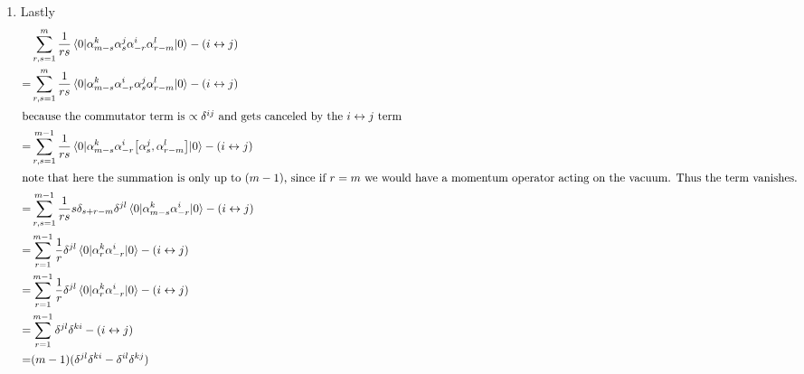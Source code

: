 \begin{enumerate}[label=(\alph*)]
\begin{enumerate}[label=(\roman*)]
			\item Lastly
				\begin{align*}
					&\sum^m_{r,s=1} \frac{1}{rs} \braket{0| \alpha^k_{m-s} \alpha^j_s \alpha^i_{-r} \alpha^l_{r-m} |0} - (i\leftrightarrow j) \\
					=&\sum^m_{r,s=1} \frac{1}{rs} \braket{0| \alpha^k_{m-s}  \alpha^i_{-r} \alpha^j_s\alpha^l_{r-m} |0} - (i\leftrightarrow j) \\
					\shortintertext{because the commutator term is $\propto \delta^{ij}$ and gets canceled by the $i\leftrightarrow j$ term}
					=&\sum^{m-1}_{r,s=1} \frac{1}{rs} \braket{0| \alpha^k_{m-s}  \alpha^i_{-r} \comm{\alpha^j_s}{\alpha^l_{r-m}} |0} - (i\leftrightarrow j) \\
					\shortintertext{note that here the summation is only up to $(m-1)$, since if $r=m$ we would have a momentum operator acting on the vacuum. Thus the term vanishes.}
					=&\sum^{m-1}_{r,s=1} \frac{1}{rs} s \delta_{s+r-m} \delta^{jl}\braket{0| \alpha^k_{m-s}  \alpha^i_{-r}  |0} - (i\leftrightarrow j) \\
					=&\sum^{m-1}_{r=1} \frac{1}{r}   \delta^{jl}\braket{0| \alpha^k_{r}  \alpha^i_{-r}  |0} - (i\leftrightarrow j) \\
					=&\sum^{m-1}_{r=1} \frac{1}{r}   \delta^{jl}\braket{0| \alpha^k_{r}  \alpha^i_{-r}  |0} - (i\leftrightarrow j) \\
					=&\sum^{m-1}_{r=1} \delta^{jl}\delta^{ki} - (i\leftrightarrow j) \\
					=& (m-1)(\delta^{jl} \delta^{ki} - \delta^{il} \delta^{kj})
				\end{align*}
		\end{enumerate}



\end{enumerate}
